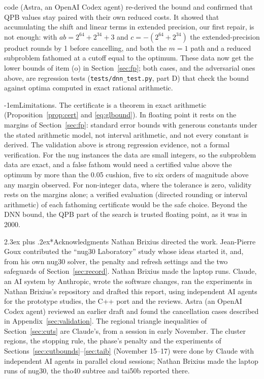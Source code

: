 \documentclass[10pt]{article}
\makeatletter
\renewcommand\section{\@startsection{section}{1}{\z@}{-3.5ex plus -1ex minus -.2ex}%
  {2.3ex plus .2ex}{\normalfont\normalsize\bfseries}}
\renewcommand\paragraph{\@startsection{paragraph}{4}{\z@}{2.5ex plus 1ex minus .2ex}%
  {-1em}{\normalfont\normalsize\bfseries}}
\theoremstyle{remark}
\makeatother
\begin{document}
\begin{itemize}
  code (Astra, an OpenAI Codex agent) re-derived the bound and confirmed that QPB
  values stay paired with their own reduced costs. It showed that accumulating the
  shift and linear terms in extended precision, our first repair, is not enough:
  with $ab = 2^{64}+2^{34}+3$ and $c = -(2^{64}+2^{34})$ the extended-precision
  product rounds by 1 before cancelling, and both the $m=1$ path and a reduced
  subproblem fathomed at a cutoff equal to the optimum. These data now get the
  lower bounds of item (o) in Section~\ref{sec:fp}; both cases, and the
  adversarial ones above, are regression tests (\texttt{tests/dnn\_test.py}, part D)
  that check the bound against optima computed in exact rational arithmetic.
\end{itemize}

\paragraph{Limitations.} The certificate is a theorem in exact arithmetic
(Proposition~\ref{prop:cert} and \eqref{eq:glbound}). In floating point it rests
on the margins of Section~\ref{sec:fp}: standard error bounds with generous
constants under the stated arithmetic model, not interval arithmetic, and not
every constant is derived. The validation above is strong regression evidence, not
a formal verification. For the nug instances the data are small integers, so the
subproblem data are exact, and a false fathom would need a certified value above
the optimum by more than the 0.05 cushion, five to six orders of magnitude above
any margin observed. For non-integer data, where the tolerance is zero, validity
rests on the margins alone; a verified evaluation (directed rounding or interval
arithmetic) of each fathoming certificate would be the safe choice. Beyond the DNN
bound, the QPB part of the search is trusted floating point, as it was in 2000.

\section*{Acknowledgments}
Nathan Brixius directed the work. Jean-Pierre Goux contributed the ``nug30
Laboratory'' study whose ideas started it, and, from his own nug30 solver, the
penalty and refresh settings and the two safeguards of Section~\ref{sec:record}.
Nathan Brixius made the laptop runs. Claude, an AI system by Anthropic, wrote
the software changes, ran the experiments in Nathan Brixius's repository and
drafted this report, using independent AI agents for the prototype studies, the C++
port and the reviews. Astra (an OpenAI Codex agent) reviewed an earlier draft and
found the cancellation cases described in Appendix~\ref{sec:validation}. The regional
triangle inequalities of Section~\ref{sec:cuts} are Claude's, from a session in early
November. The cluster
regions, the stopping rule, the phase's penalty and the experiments of
Sections~\ref{sec:cutbounds}--\ref{sec:taib} (November 15--17) were done by Claude
with independent AI agents in parallel cloud sessions; Nathan Brixius made the
laptop runs of nug30, the tho40 subtree and tai50b reported there.
\end{document}
